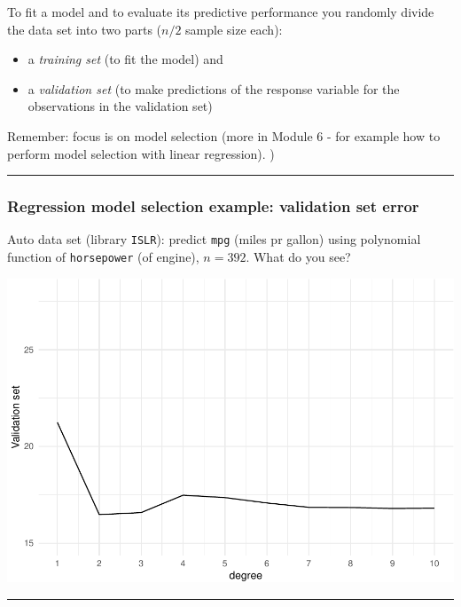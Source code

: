 \documentclass[]{article}
\providecommand{\tightlist}{%
  \setlength{\itemsep}{0pt}\setlength{\parskip}{0pt}}
\begin{document}
To fit a model and to evaluate its predictive performance you randomly
divide the data set into two parts (\(n/2\) sample size each):

\begin{itemize}
\tightlist
\item
  a \emph{training set} (to fit the model) and
\item
  a \emph{validation set} (to make predictions of the response variable
  for the observations in the validation set)
\end{itemize}

Remember: focus is on model selection (more in Module 6 - for example
how to perform model selection with linear regression). )

\begin{center}\rule{0.5\linewidth}{\linethickness}\end{center}

\hypertarget{regression-model-selection-example-validation-set-error}{%
\subsubsection{Regression model selection example: validation set
error}\label{regression-model-selection-example-validation-set-error}}

Auto data set (library \texttt{ISLR}): predict \texttt{mpg} (miles pr
gallon) using polynomial function of \texttt{horsepower} (of engine),
\(n=392\). What do you see?

\includegraphics{5Resample_files/figure-latex/unnamed-chunk-1-1.pdf}

\begin{center}\rule{0.5\linewidth}{\linethickness}\end{center}
\end{document}

